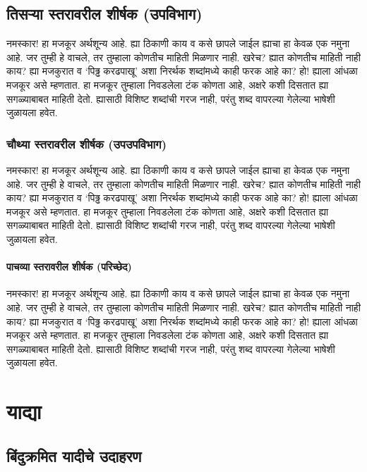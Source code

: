 \subsection{तिसऱ्या स्तरावरील शीर्षक (उपविभाग)}

नमस्कार! हा मजकूर अर्थशून्य आहे. ह्या ठिकाणी काय व कसे छापले जाईल ह्याचा हा केवळ एक नमुना
आहे. जर तुम्ही हे वाचले, तर तुम्हाला कोणतीच माहिती मिळणार नाही. खरेच? ह्यात कोणतीच माहिती
नाही काय? ह्या मजकुरात व `पिढ्ढ करढपाखू' अशा निरर्थक शब्दांमध्ये काही फरक आहे का? हो!
ह्याला आंधळा मजकूर असे म्हणतात. हा मजकूर तुम्हाला निवडलेला टंक कोणता आहे, अक्षरे कशी दिसतात
ह्या सगळ्याबाबत माहिती देतो. ह्यासाठी विशिष्ट शब्दांची गरज नाही, परंतु शब्द वापरल्या गेलेल्या
भाषेशी जुळायला हवेत.

\subsubsection{चौथ्या स्तरावरील शीर्षक (उपउपविभाग)}
नमस्कार! हा मजकूर अर्थशून्य आहे. ह्या ठिकाणी काय व कसे छापले जाईल ह्याचा हा केवळ एक नमुना
आहे. जर तुम्ही हे वाचले, तर तुम्हाला कोणतीच माहिती मिळणार नाही. खरेच? ह्यात कोणतीच माहिती
नाही काय? ह्या मजकुरात व `पिढ्ढ करढपाखू' अशा निरर्थक शब्दांमध्ये काही फरक आहे का? हो!
ह्याला आंधळा मजकूर असे म्हणतात. हा मजकूर तुम्हाला निवडलेला टंक कोणता आहे, अक्षरे कशी दिसतात
ह्या सगळ्याबाबत माहिती देतो. ह्यासाठी विशिष्ट शब्दांची गरज नाही, परंतु शब्द वापरल्या गेलेल्या
भाषेशी जुळायला हवेत.

\paragraph{पाचव्या स्तरावरील शीर्षक (परिच्छेद)}
नमस्कार! हा मजकूर अर्थशून्य आहे. ह्या ठिकाणी काय व कसे छापले जाईल ह्याचा हा केवळ एक नमुना
आहे. जर तुम्ही हे वाचले, तर तुम्हाला कोणतीच माहिती मिळणार नाही. खरेच? ह्यात कोणतीच माहिती
नाही काय? ह्या मजकुरात व `पिढ्ढ करढपाखू' अशा निरर्थक शब्दांमध्ये काही फरक आहे का? हो!
ह्याला आंधळा मजकूर असे म्हणतात. हा मजकूर तुम्हाला निवडलेला टंक कोणता आहे, अक्षरे कशी दिसतात
ह्या सगळ्याबाबत माहिती देतो. ह्यासाठी विशिष्ट शब्दांची गरज नाही, परंतु शब्द वापरल्या गेलेल्या
भाषेशी जुळायला हवेत.

\section{याद्या}

\subsection{बिंदुक्रमित यादीचे उदाहरण}


